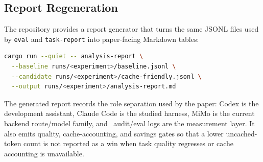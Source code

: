\subsection{Report Regeneration}

The repository provides a report generator that turns the same JSONL files used by \texttt{eval} and \texttt{task-report} into paper-facing Markdown tables:

\begin{lstlisting}[language=bash,basicstyle=\ttfamily\small,breaklines=true,frame=single]
cargo run --quiet -- analysis-report \
  --baseline runs/<experiment>/baseline.jsonl \
  --candidate runs/<experiment>/cache-friendly.jsonl \
  --output runs/<experiment>/analysis-report.md
\end{lstlisting}

The generated report records the role separation used by the paper: Codex is the development assistant, Claude Code is the studied harness, MiMo is the current backend route/model family, and \toolname\ audit/eval logs are the measurement layer. It also emits quality, cache-accounting, and savings gates so that a lower uncached-token count is not reported as a win when task quality regresses or cache accounting is unavailable.
